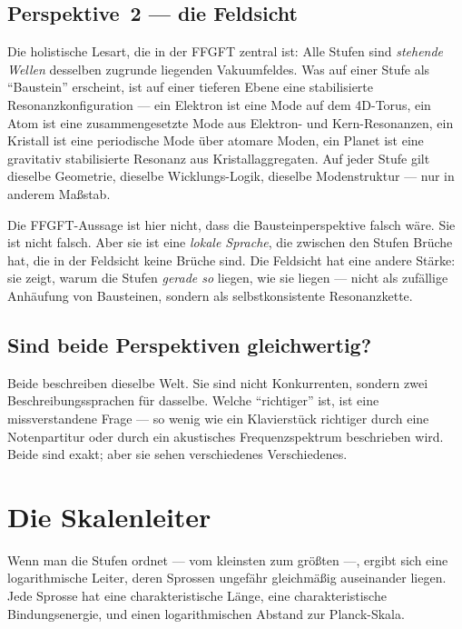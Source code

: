 \subsection*{Perspektive~2 --- die Feldsicht}

Die holistische Lesart, die in der FFGFT zentral ist: Alle Stufen sind
\emph{stehende Wellen} desselben zugrunde liegenden Vakuumfeldes. Was
auf einer Stufe als ``Baustein'' erscheint, ist auf einer tieferen Ebene
eine stabilisierte Resonanzkonfiguration --- ein Elektron ist eine
Mode auf dem 4D-Torus, ein Atom ist eine zusammengesetzte Mode aus
Elektron- und Kern-Resonanzen, ein Kristall ist eine periodische Mode
über atomare Moden, ein Planet ist eine gravitativ stabilisierte
Resonanz aus Kristallaggregaten. Auf jeder Stufe gilt dieselbe
Geometrie, dieselbe Wicklungs-Logik, dieselbe Modenstruktur --- nur in
anderem Maßstab.

Die FFGFT-Aussage ist hier nicht, dass die Bausteinperspektive falsch
wäre. Sie ist nicht falsch. Aber sie ist eine \emph{lokale Sprache}, die
zwischen den Stufen Brüche hat, die in der Feldsicht keine Brüche sind.
Die Feldsicht hat eine andere Stärke: sie zeigt, warum die Stufen
\emph{gerade so} liegen, wie sie liegen --- nicht als zufällige Anhäufung
von Bausteinen, sondern als selbstkonsistente Resonanzkette.

\subsection*{Sind beide Perspektiven gleichwertig?}

Beide beschreiben dieselbe Welt. Sie sind nicht Konkurrenten, sondern
zwei Beschreibungssprachen für dasselbe. Welche ``richtiger'' ist, ist
eine missverstandene Frage --- so wenig wie ein Klavierstück richtiger
durch eine Notenpartitur oder durch ein akustisches Frequenzspektrum
beschrieben wird. Beide sind exakt; aber sie sehen verschiedenes
Verschiedenes.

\section{Die Skalenleiter}

Wenn man die Stufen ordnet --- vom kleinsten zum größten ---, ergibt
sich eine logarithmische Leiter, deren Sprossen ungefähr gleichmäßig
auseinander liegen. Jede Sprosse hat eine charakteristische Länge,
eine charakteristische Bindungsenergie, und einen logarithmischen
Abstand zur Planck-Skala.

